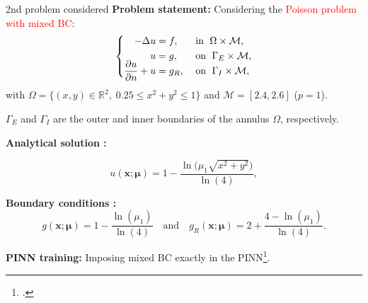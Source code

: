 \begin{frame}{2nd problem considered} 
	\textbf{Problem statement:} Considering the \textcolor{red}{Poisson problem with mixed BC}:
	\vspace{-5pt}
	\begin{equation*}
		\left\{
		\begin{aligned}
			-\Delta u & = f, \; &  & \text{in } \; \Omega \times \mathcal{M}, \\
			u         & = g, \;  &  & \text{on } \; \Gamma_E \times \mathcal{M}, \\
			\smash{\frac{\partial u}{\partial n}}+u  & = g_R, \;  &  & \text{on } \; \Gamma_I \times \mathcal{M},
		\end{aligned}
		\right.
	\end{equation*}

	with $\Omega=\{(x,y)\in\mathbb{R}^2, \; 0.25\le x^2+y^2\le 1\}$ and $\mathcal{M}=[2.4,2.6]$ ($p=1$).
	
	$\Gamma_E$ and $\Gamma_I$ are the outer and inner boundaries of the annulus $\Omega$, respectively.

	\vspace{2pt}
	\textbf{Analytical solution :}

	\vspace{-12pt}
	\begin{equation*}
		u(\bm{x};\bm{\mu})= 1 - \frac{\ln\big(\mu_1\sqrt{x^2+y^2}\big)}{\ln(4)},
	\end{equation*}
	\vspace{-5pt}
	
	\textbf{Boundary conditions :}
	\begin{equation*}
		g(\bm{x};\bm{\mu})=1 - \frac{\ln(\mu_1)}{\ln(4)} \quad \text{and} \quad g_R(\bm{x};\bm{\mu})=2 + \frac{4-\ln(\mu_1)}{\ln(4)}.
	\end{equation*}

	\vspace{2pt}
	\small
	\textbf{PINN training:} Imposing mixed BC exactly in the PINN\footcite{Sukumar_2022}.

	\vspace{8pt}
\end{frame}

